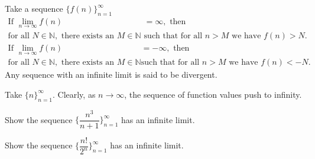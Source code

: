 \begin{definition}
Take a sequence $\{f(n)\}_{n=1}^{\infty}$ 
\begin{align*}
    \text{If} \hspace{4pt} \lim_{n \longrightarrow \infty} f(n) &= \infty, \hspace{4pt} \text{then}\\[2ex]
    \text{for all} \hspace{4pt} N \in \mathbb{N}, \hspace{4pt} \text{there exists an} \hspace{4pt} M \in \mathbb{N} \hspace{4pt} &\text{such that for all} \hspace{4pt} n > M \hspace{4pt} \text{we have} \hspace{4pt} f(n) > N.
\end{align*}
\begin{align*}
    \text{If} \hspace{4pt} \lim_{n \longrightarrow \infty} f(n) &= -\infty, \hspace{4pt} \text{then}\\[2ex]
    \text{for all} \hspace{4pt} N \in \mathbb{N}, \hspace{4pt} \text{there exists an} \hspace{4pt} M \in \mathbb{N} \hspace{4pt} &\text{such that for all} \hspace{4pt} n > M \hspace{4pt} \text{we have} \hspace{4pt} f(n) < -N.
\end{align*}
Any sequence with an infinite limit is said to be divergent.
\label{definition_infinite_limit_sequence}
\end{definition}

\begin{example}
Take $\{n\}_{n=1}^{\infty}$. Clearly, as $n \longrightarrow \infty$, the sequence of function values push to infinity.
\end{example}

\begin{exercise}
Show the sequence $\Big\{\dfrac{n^{3}}{n+1}\Big\}_{n=1}^{\infty}$ has an infinite limit. 
\end{exercise}

\begin{exercise}
Show the sequence $\Big\{\dfrac{n!}{2^{n}}\Big\}_{n=1}^{\infty}$ has an infinite limit. 
\end{exercise}

